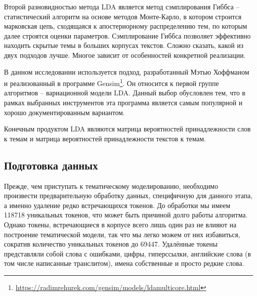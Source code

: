Второй разновидностью метода LDA является метод сэмплирования Гиббса -- статистический алгоритм на основе методов Монте-Карло, в котором строится марковская цепь, сходящаяся к апостериорному распределению тем, по которым далее строятся оценки параметров. Сэмплирование Гиббса позволяет эффективно находить скрытые темы в больших корпусах текстов. Сложно сказать, какой из двух подходов лучше. Многое зависит от особенностей конкретной реализации.

В данном исследовании используется подход, разработанный Мэтью Хоффманом \cite{HoffmanBB10} и реализованный в программе Gensim\footnote{\href{https://radimrehurek.com/gensim/models/ldamulticore.html}{https://radimrehurek.com/gensim/models/ldamulticore.html}}. Он относится к первой группе алгоритмов -- вариационной модели LDA. Данный выбор обусловлен тем, что в рамках выбранных инструментов эта программа является самым популярной и хорошо документированным вариантом.

Конечным продуктом LDA являются матрица вероятностей принадлежности слов к темам и матрица вероятностей принадлежности текстов к темам.


\subsection{Подготовка данных}
Прежде, чем приступать к тематическому моделированию, необходимо произвести предварительную обработку данных, специфичную для данного этапа, а именно удаление редко встречающихся токенов. До обработки мы имеем 118718 уникальных токенов, что может быть причиной долго работы алгоритма. Однако токены, встречающиеся в корпусе всего лишь один раз не влияют на построение тематической модели, так что мы легко можем от них избавиться, сократив количество уникальных токенов до 69447. Удалённые токены представляли собой слова с ошибками, цифры, гиперссылки, английские слова (в том числе написанные транслитом), имена собственные и просто редкие слова.

